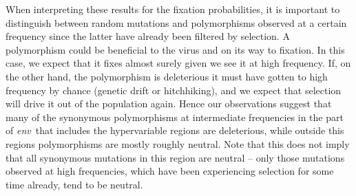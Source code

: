 \documentclass[rmp, twocolumn]{revtex4}
\newcommand{\env}{\textit{env}}
\begin{document}
When interpreting these results for the fixation probabilities, it is important
to distinguish between random mutations and polymorphisms observed at a certain
frequency since the latter have already been filtered by selection.
A polymorphism could be beneficial to the virus and on its way to fixation. In
this case, we expect that it fixes almost surely given we see it at high
frequency. If, on the other hand, the polymorphism is deleterious it must have
gotten to high frequency by chance (genetic drift or hitchhiking), and
we expect that selection will drive it out of the population again. Hence our
observations suggest that many of the synonymous polymorphisms at intermediate
frequencies in the part of \env~that includes the hypervariable regions are
deleterious, while outside this regions polymorphisms are mostly roughly
neutral. Note that this does not imply that all synonymous mutations in this
region are neutral -- only those mutations observed at high frequencies, which
have been experiencing selection for some time already, tend to be neutral.
\end{document}
